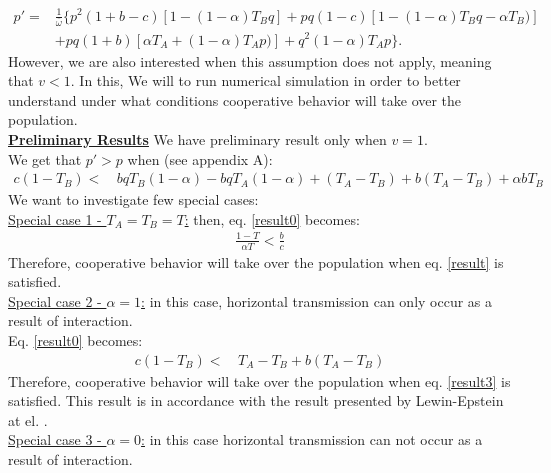 \documentclass{article}
\begin{document}
\begin{equation} 
\begin{split}\label{eq:model_v=1}
p' =& \frac{1}{\overline{\omega}} \{ p^2(1+b-c)[1-(1-\alpha)T_Bq] + pq(1-c)[1-(1-\alpha)T_Bq-\alpha T_B)]\\
&+ pq(1+b)[\alpha T_A+(1-\alpha)T_Ap)] + q^2(1-\alpha)T_Ap\}.
\end{split}
\end{equation}
However, we are also interested when this assumption does not apply, meaning that $v<1$. In this, We will to run numerical simulation in order to better understand under what conditions cooperative behavior will take over the population. 
\\\textbf{\underline{Preliminary Results}}
We have preliminary result only when $v=1$.
\\We get that $p'>p$ when (see appendix A):
\begin{equation} 
\begin{split} \label{result0}
 c(1-T_B) < & \,  bqT_B(1-\alpha) - bqT_A(1-\alpha) + (T_A-T_B) + b(T_A - T_B) + \alpha bT_B
\end{split}
\end{equation}
We want to investigate few special cases:
\\\underline{Special case 1 - $T_A = T_B = T$:} then, eq. \eqref{result0} becomes:
\begin{equation}
\begin{split} \label{result}
 \frac{1-T}{\alpha T}< \frac{b}{c}
\end{split}
\end{equation}
Therefore, cooperative behavior will take over the population when eq. \eqref{result} is satisfied.  
\\\underline{Special case 2 - $\alpha =1$:} in this case, horizontal transmission can only occur as a result of interaction.
\\Eq. \eqref{result0} becomes:
\begin{equation} 
\begin{split} \label{result3}
c(1-T_B)  < & \, T_A -T_B +b(T_A-T_B)
\end{split}
\end{equation}
Therefore, cooperative behavior will take over the population when eq. \eqref{result3} is satisfied. 
This result is in accordance with the result presented by Lewin-Epstein at el. \cite{Ohad}. 
\\\underline{Special case 3 - $\alpha = 0$:} in this case horizontal transmission can not occur as a result of interaction.  
\end{document}
